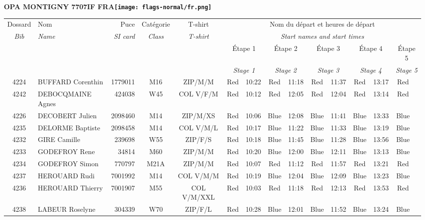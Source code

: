 \documentclass{report}
\begin{document}
\newpage
  \Huge \centering \bfseries OPA MONTIGNY 7707IF FRA\normalfont \footnotesize \sffamily \hfill \texttt{[image: flags-normal/fr.png]} \newline 
  \begin{longtable}{|c|l|r|c|c|*{5}{cc|}}
    Dossard & Nom  & Puce    & Catégorie & T-shirt & \multicolumn{10}{c|}{Nom du départ et heures de départ} \\
    \itshape Bib     & \itshape Name & \itshape SI card & \itshape Class  & \itshape  T-shirt  & \multicolumn{10}{c|}{\itshape Start names and start times} \\
    \hline
    & & & & & \multicolumn{2}{c|}{Étape 1} & \multicolumn{2}{c|}{Étape 2} & \multicolumn{2}{c|}{Étape 3} & \multicolumn{2}{c|}{Étape 4} & \multicolumn{2}{c|}{Étape 5} \\
    & & & & & \multicolumn{2}{c|}{\itshape Stage 1} & \multicolumn{2}{c|}{\itshape Stage 2} & \multicolumn{2}{c|}{\itshape Stage 3} & \multicolumn{2}{c|}{\itshape Stage 4} & \multicolumn{2}{c|}{\itshape Stage 5} \\
    \hline
    4224 & BUFFARD Corenthin & 1779011 & M16 & ZIP/M/M & Red & 10:22 & Red & 11:18 & Red & 11:37 & Red & 13:17 & Red &  \\
    4242 & DEBOCQMAINE Agnes & 424038 & W45 & COL V/F/M & Red & 10:12 & Red & 12:05 & Red & 12:04 & Red & 13:14 & Red &  \\
    4226 & DECOBERT Julien & 2098460 & M14 & ZIP/M/XS & Red & 10:06 & Blue & 12:08 & Blue & 11:41 & Blue & 13:33 & Blue &  \\
    4235 & DELORME Baptiste & 2098458 & M14 & COL V/M/L & Red & 10:17 & Blue & 11:22 & Blue & 11:33 & Blue & 13:19 & Blue &  \\
    4232 & GIRE Camille & 239698 & W55 & ZIP/F/S & Red & 10:18 & Blue & 11:45 & Blue & 11:28 & Blue & 13:56 & Blue &  \\
    4233 & GODEFROY Rene & 34814 & M60 & ZIP/M/M & Red & 10:20 & Blue & 12:00 & Blue & 12:11 & Blue & 13:13 & Blue &  \\
    4234 & GODEFROY Simon & 770797 & M21A & ZIP/M/M & Red & 10:07 & Red & 11:12 & Red & 11:57 & Red & 13:21 & Red &  \\
    4237 & HEROUARD Rudi & 7001992 & M14 & COL V/M/M & Red & 10:19 & Blue & 12:04 & Blue & 12:09 & Blue & 13:23 & Blue &  \\
    4236 & HEROUARD Thierry & 7001907 & M55 & COL V/M/XXL & Red & 10:03 & Red & 11:18 & Red & 12:13 & Red & 13:53 & Red &  \\
    4238 & LABEUR Roselyne & 304339 & W70 & ZIP/F/L & Red & 10:28 & Blue & 12:01 & Blue & 11:52 & Blue & 13:24 & Blue &  \\

\end{longtable}
\end{document}
